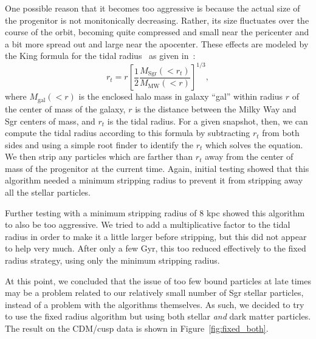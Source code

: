 One possible reason that it becomes too aggressive is because the actual
size of the progenitor is not monitonically decreasing.  Rather, its size
fluctuates over the course of the orbit, becoming quite compressed and small
near the pericenter and a bit more spread out and large near the apocenter.
These effects are modeled by the King formula for the tidal
radius~\cite{king_structure_1962} as given in~\cite{dierickx_predicted_2017}:
\begin{equation} \label{eq:king_radius}
    r_t = r \left[ \frac{1}{2} 
    \frac{M_{\text{Sgr}}(<r_t)}{M_{\text{MW}}(<r)} \right]^{1/3},
\end{equation}
where $M_{\text{gal}}(<r)$ is the enclosed halo mass in galaxy ``gal'' within
radius $r$ of the center of mass of the galaxy, $r$ is the distance between
the Milky Way and Sgr centers of mass, and $r_t$ is the tidal radius.  For a
given snapshot, then, we can compute the tidal radius according to this
formula by subtracting $r_t$ from both sides and using a simple root finder to
identify the $r_t$ which solves the equation.  We then strip any particles
which are farther than $r_t$ away from the center of mass of the progenitor at
the current time.  Again, initial testing showed that this algorithm needed a
minimum stripping radius to prevent it from stripping away all the stellar
particles.

Further testing with a minimum stripping radius of 8 kpc showed this algorithm
to also be too aggressive.  We tried to add a multiplicative factor to the tidal
radius in order to make it a little larger before stripping, but this did not
appear to help very much. After only a few Gyr, this too reduced effectively to
the fixed radius strategy, using only the minimum stripping radius.

At this point, we concluded that the issue of too few bound particles at late
times may be a problem related to our relatively small number of Sgr stellar
particles, instead of a problem with the algorithms themselves.  As such, we
decided to try to use the fixed radius algorithm but using both stellar
\textit{and} dark matter particles.  The result on the CDM/cusp data is shown
in Figure~\ref{fig:fixed_both}.

